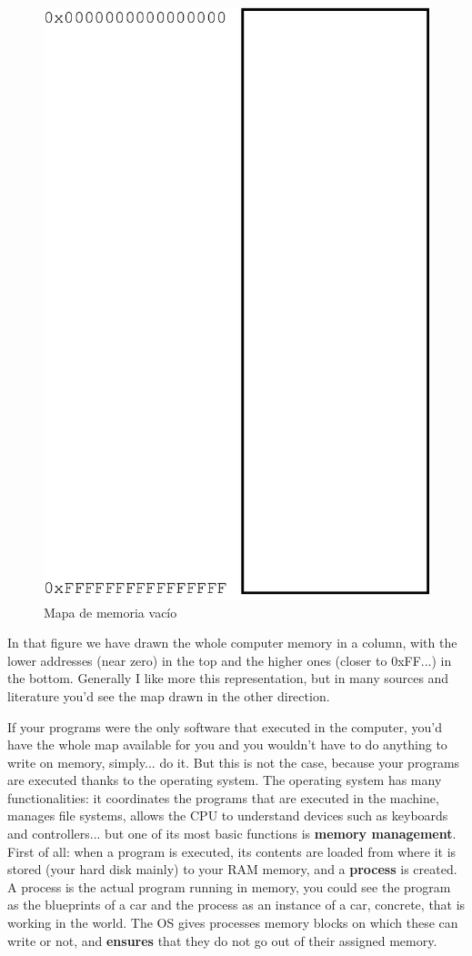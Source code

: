 \documentclass[a4paper]{article}
\begin{document}
\begin{figure}[H]
    \center
    \includegraphics[width=0.5\linewidth]{emptyMemoryMap}
    \caption{Mapa de memoria vacío}
    \label{img:emptyMemoryMap}
\end{figure}
In that figure we have drawn the whole computer memory in a column, with
the lower addresses (near zero) in the top and the higher ones (closer to
0xFF...) in the bottom. Generally I like more this representation, but in
many sources and literature you'd see the map drawn in the other direction.

If your programs were the only software that executed in the computer, you'd
have the whole map available for you and you wouldn't have to do anything to
write on memory, simply... do it. But this is not the case, because your
programs are executed thanks to the operating system. The operating system has
many functionalities: it coordinates the programs that are executed in the
machine, manages file systems, allows the CPU to understand devices such as
keyboards and controllers... but one of its most basic functions is \textbf{
memory management}. First of all: when a program is executed, its contents are
loaded from where it is stored (your hard disk mainly) to your RAM memory, and a
\textbf{process} is created. A process is the actual program running in memory,
you could see the program as the blueprints of a car and the process as an
instance of a car, concrete, that is working in the world.
The OS gives processes memory blocks on which these can
write or not, and \textbf{ensures} that they do not go out of their assigned
memory.
\end{document}

